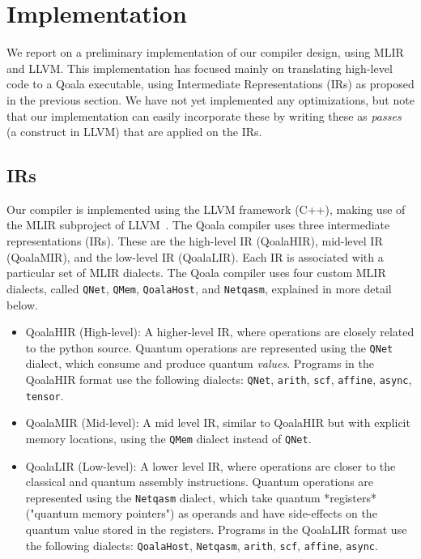 \section{Implementation}

We report on a preliminary implementation of our compiler design, using MLIR and LLVM.
This implementation has focused mainly on translating high-level code to a Qoala executable, using Intermediate Representations (IRs) as proposed in the previous section.
We have not yet implemented any optimizations, but note that our implementation can easily incorporate these by writing these as \emph{passes} (a construct in LLVM) that are applied on the IRs.

\subsection{IRs}
Our compiler is implemented using the LLVM framework (C++), making use of the MLIR subproject of LLVM~\cite{lattner_mlir_2020}.
The Qoala compiler uses three intermediate representations (IRs).
These are the high-level IR (QoalaHIR), mid-level IR (QoalaMIR), and the low-level IR (QoalaLIR).
Each IR is associated with a particular set of MLIR dialects.
The Qoala compiler uses four custom MLIR dialects, called \texttt{QNet}, \texttt{QMem}, \texttt{QoalaHost}, and \texttt{Netqasm}, explained in more detail below.

\begin{itemize}
    \item QoalaHIR (High-level): A higher-level IR, where operations are closely related
    to the python source.
    Quantum operations are represented using the \texttt{QNet} dialect, which consume and produce quantum \emph{values}.
    Programs in the QoalaHIR format use the following dialects: \texttt{QNet}, \texttt{arith}, \texttt{scf}, \texttt{affine}, \texttt{async}, \texttt{tensor}.
    \item QoalaMIR (Mid-level): A mid level IR, similar to QoalaHIR but with explicit memory locations, using the \texttt{QMem} dialect instead of \texttt{QNet}.
    \item QoalaLIR (Low-level): A lower level IR, where operations are closer to the classical and quantum assembly instructions.
    Quantum operations are represented using the \texttt{Netqasm} dialect, which take quantum *registers* ("quantum memory pointers") as operands
    and have side-effects on the quantum value stored in the registers.
    Programs in the QoalaLIR format use the following dialects: \texttt{QoalaHost}, \texttt{Netqasm}, \texttt{arith}, \texttt{scf}, \texttt{affine}, \texttt{async}.
\end{itemize}

